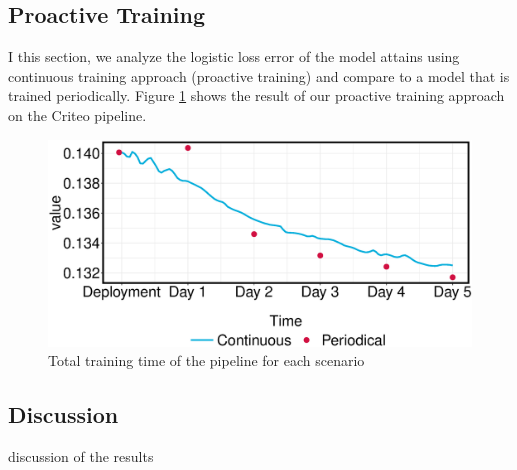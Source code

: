 \subsection{Proactive Training}
I this section, we analyze the logistic loss error of the model attains using continuous training approach (proactive training) and compare to a model that is trained periodically.
Figure \ref{fig:loss-proactive-vs-daily} shows the result of our proactive training approach on the Criteo pipeline.

\begin{figure}[h!]
\centering
\includegraphics[width=\columnwidth]{../images/experiment-results/criteo-proactive-training-experiment.eps}
\caption{Total training time of the pipeline for each scenario}
\label{fig:loss-proactive-vs-daily}
\vspace{2mm}
\end{figure}


\subsection{Discussion} \label{subsec:discussion}
discussion of the results
